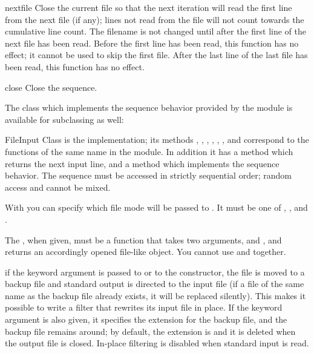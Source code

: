 \begin{funcdesc}{nextfile}{}
  Close the current file so that the next iteration will read the
  first line from the next file (if any); lines not read from the file
  will not count towards the cumulative line count.  The filename is
  not changed until after the first line of the next file has been
  read.  Before the first line has been read, this function has no
  effect; it cannot be used to skip the first file.  After the last
  line of the last file has been read, this function has no effect.
\end{funcdesc}

\begin{funcdesc}{close}{}
  Close the sequence.
\end{funcdesc}


The class which implements the sequence behavior provided by the
module is available for subclassing as well:

\begin{classdesc}{FileInput}{}
  Class  is the implementation; its methods
  , , ,
  , , ,
   and  correspond to the functions
  of the same name in the module.
  In addition it has a  method which
  returns the next input line, and a  method
  which implements the sequence behavior.  The sequence must be
  accessed in strictly sequential order; random access and
   cannot be mixed.

  With  you can specify which file mode will be passed to
  . It must be one of , ,
   and .

  The , when given, must be a function that takes two arguments,
   and , and returns an accordingly opened
  file-like object.
  You cannot use  and  together.

\end{classdesc}

 if the keyword argument
 is passed to  or to the
 constructor, the file is moved to a backup file and
standard output is directed to the input file (if a file of the same
name as the backup file already exists, it will be replaced silently).
This makes it possible to write a filter that rewrites its input file
in place.  If the keyword argument  is also given, it specifies the extension for the backup
file, and the backup file remains around; by default, the extension is
 and it is deleted when the output file is closed.  In-place
filtering is disabled when standard input is read.

